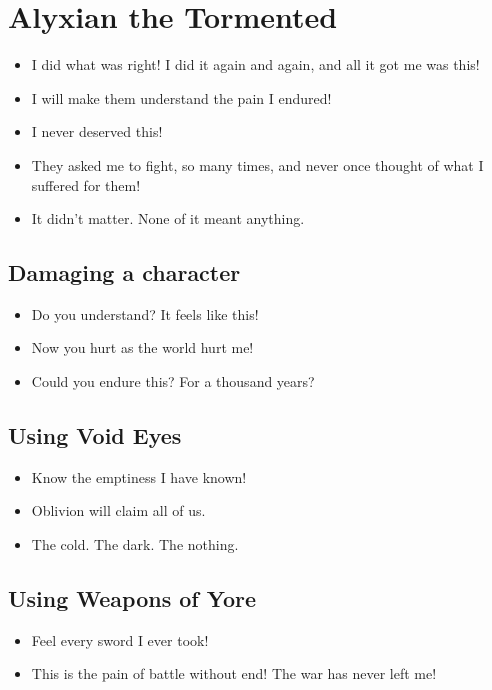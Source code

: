\documentclass[10pt,a4paper,bg=print,twocolumn,openany,nodeprecatedcode]{dndarticle}
\begin{document}
\section*{Alyxian the Tormented}

\begin{itemize}
  \item I did what was right! I did it again and again, and all it got me was this!
  \item I will make them understand the pain I endured!
  \item I never deserved this!
  \item They asked me to fight, so many times, and never once thought of what I suffered for them!
  \item It didn't matter. None of it meant anything.
\end{itemize}

\subsection*{Damaging a character}
\begin{itemize}
  \item Do you understand? It feels like this!
  \item Now you hurt as the world hurt me!
  \item Could you endure this? For a thousand years?
\end{itemize}

\subsection*{Using Void Eyes}
\begin{itemize}
  \item Know the emptiness I have known!
  \item Oblivion will claim all of us.
  \item The cold. The dark. The nothing.
\end{itemize}

\subsection*{Using Weapons of Yore}
\begin{itemize}
  \item Feel every sword I ever took!
  \item This is the pain of battle without end! The war has never left me!
\end{itemize}
\end{document}
